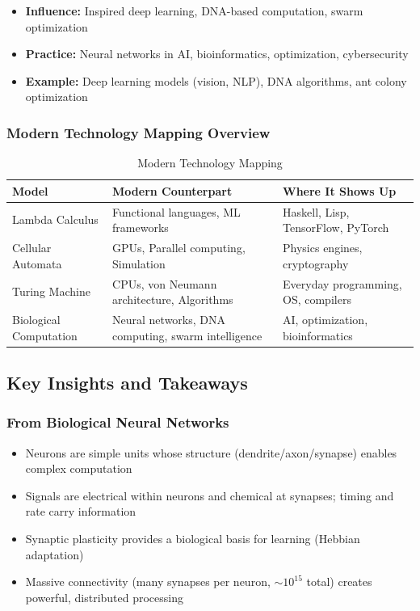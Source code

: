\begin{itemize}
\item \textbf{Influence:} Inspired deep learning, DNA-based computation, swarm optimization
\item \textbf{Practice:} Neural networks in AI, bioinformatics, optimization, cybersecurity
\item \textbf{Example:} Deep learning models (vision, NLP), DNA algorithms, ant colony optimization
\end{itemize}

\subsubsection{Modern Technology Mapping Overview}

\begin{table}[h!]
\centering
\begin{tabular}{|l|l|l|}
\hline
\textbf{Model} & \textbf{Modern Counterpart} & \textbf{Where It Shows Up} \\
\hline
Lambda Calculus & Functional languages, ML frameworks & Haskell, Lisp, TensorFlow, PyTorch \\
\hline
Cellular Automata & GPUs, Parallel computing, Simulation & Physics engines, cryptography \\
\hline
Turing Machine & CPUs, von Neumann architecture, Algorithms & Everyday programming, OS, compilers \\
\hline
Biological Computation & Neural networks, DNA computing, swarm intelligence & AI, optimization, bioinformatics \\
\hline
\end{tabular}
\caption{Modern Technology Mapping}
\end{table}

\subsection{Key Insights and Takeaways}

\subsubsection{From Biological Neural Networks}

\begin{itemize}
\item Neurons are simple units whose structure (dendrite/axon/synapse) enables complex computation
\item Signals are electrical within neurons and chemical at synapses; timing and rate carry information
\item Synaptic plasticity provides a biological basis for learning (Hebbian adaptation)
\item Massive connectivity (many synapses per neuron, $\sim 10^{15}$ total) creates powerful, distributed processing
\end{itemize}

